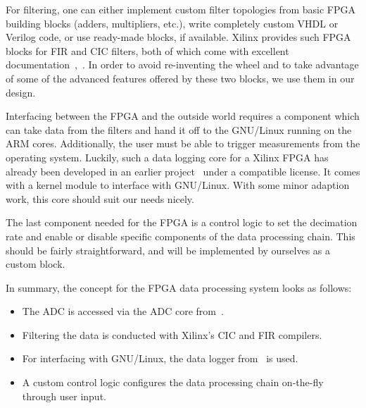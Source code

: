 For filtering,  one can either  implement custom filter topologies  from basic
FPGA building blocks (adders, multipliers, etc.), write completely custom VHDL
or Verilog code, or use ready-made blocks, if available.  Xilinx provides such
FPGA  blocks for  FIR  and CIC  filters,  both of  which  come with  excellent
documentation~\cite{xilinx:cic-compiler},~\cite{xilinx:fir-compiler}.       In
order to  avoid re-inventing the  wheel and to take  advantage of some  of the
advanced features offered by these two blocks, we use them in our design.

Interfacing between the FPGA and the  outside world requires a component which
can take data from the filters and hand it off to the GNU/Linux running on the
ARM cores. Additionally,  the user must  be able to trigger  measurements from
the operating system.  Luckily, such a data logging core for a Xilinx FPGA has
already been  developed in an  earlier project~\cite{pita:github:huess-schnid}
under a compatible  license.  It comes with a kernel  module to interface with
GNU/Linux. With  some minor  adaption work,  this core  should suit  our needs
nicely.

The  last  component needed  for  the  FPGA is  a  control  logic to  set  the
decimation  rate  and  enable  or  disable specific  components  of  the  data
processing  chain. This  should  be   fairly  straightforward,  and   will  be
implemented by ourselves as a custom block.

In summary, the concept for the FPGA data processing system looks as follows:
\begin{itemize}\tightlist
    \item
        The      ADC      is      accessed     via      the      ADC      core
        from~\cite{pita:github:pitaya-notes}.
    \item
        Filtering the data is conducted with Xilinx's CIC and FIR compilers.
    \item
        For     interfacing     with     GNU/Linux,    the     data     logger
        from~\cite{pita:github:huess-schnid} is used.
    \item
        A custom control logic configures the data processing chain on-the-fly
        through user input.
\end{itemize}

%
%
